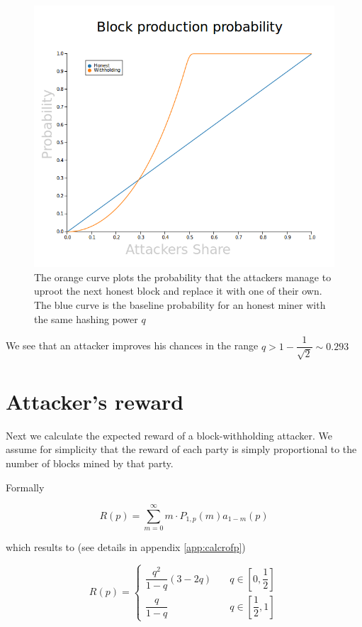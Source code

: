\documentclass[letterpaper,12pt]{report}
\theoremstyle{plain}
\theoremstyle{definition}
\begin{document}
\begin{figure}[pos]
\centering
\includegraphics[width=150mm]{blocksurvival.png}
\caption{The orange curve plots the probability that the attackers manage to uproot the next honest block and replace it with one of their own. The blue curve is the baseline probability for an honest miner with the same hashing power $q$}
\label{fig:PlotProbOfSuccess}
\end{figure}

We see that an attacker improves his chances in the range $q>1-\dfrac{1}{\sqrt{2}} \sim 0.293$
\newpage
\section{Attacker's reward}
Next we calculate the expected reward of a block-withholding attacker.
We assume for simplicity that the reward of each party is simply proportional to the number of blocks mined by that party.

Formally

\begin{equation}\label{eq:rofpdef}
\mathit{R}(p)=\sum_{m=0}^{\infty}m\cdot\mathit{P}_{1,p}(m)\mathit{a}_{1-m}(p)
\end{equation}

which results to (see details in appendix \ref{app:calcrofp})

\begin{equation}\label{eq:rofp}
\mathit{R}(p)=
\begin{cases}
\dfrac{q^2}{1-q}\left(
3-2q
\right) & \quad q \in [0,\dfrac{1}{2}] \\
\dfrac{q}{1-q} & \quad q \in [\dfrac{1}{2},1] 
\end{cases}
\end{equation}
\end{document}

